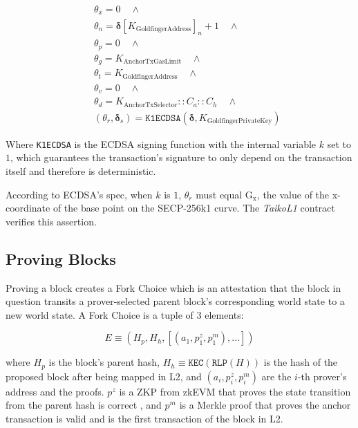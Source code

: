\documentclass[9pt,oneside]{amsart}
\begin{document}
\begin{multicols}{2}
\begin{eqnarray}
& & \theta_x = 0 \quad \wedge \\
\nonumber& & \theta_n = \boldsymbol{\delta}[K_{\mathrm{GoldfingerAddress}}]_n + 1 \quad \wedge \\
\nonumber& & \theta_p = 0 \quad \wedge \\
\nonumber& & \theta_g = K_{\mathrm{AnchorTxGasLimit}} \quad \wedge \\
\nonumber& & \theta_t = K_{\mathrm{GoldfingerAddress}} \quad \wedge  \\
\nonumber& & \theta_v = 0 \quad \wedge  \\
\nonumber& & \theta_d = K_{\mathrm{AnchorTxSelector}}::C_a::C_h \quad \wedge  \\
\nonumber& & (\theta_r,\boldsymbol{\delta}_s) = \texttt{K1ECDSA}(\boldsymbol{\delta}, K_{\mathrm{GoldfingerPrivateKey}})
\end{eqnarray}

Where \texttt{K1ECDSA} is the ECDSA\cite{ecdsa} signing function with the internal variable $k$ set to $1$, which guarantees the transaction's signature to only depend on the transaction itself and therefore is deterministic\cite{ecdsak}.

According to ECDSA's spec, when $k$ is $1$, $\theta_r$ must equal $\mathrm{G_x}$, the value of the x-coordinate of the base point on the SECP-256k1 curve. The \textit{TaikoL1} contract verifies this assertion.


\subsection{Proving Blocks} \label{sec:proving}

Proving a block creates a Fork Choice which is an attestation that the block in question transits a prover-selected parent block's corresponding world state to a new world state. A Fork Choice is a tuple of 3 elements:

\begin{equation}
E \equiv (H_p, H_h, [(a_1, p^{z}_1, p^{m}_1),...])
\end{equation}

where $H_p$ is the block's parent hash, $H_h \equiv \texttt{KEC}(\texttt{RLP}(H))$ is the hash of the proposed block after being mapped in L2, and $(a_i, p^{z}_i, p^{m}_i)$ are the $i$-th prover's address and the proofs. $p^{z}$ is a ZKP from zkEVM that proves the state transition from the parent hash is correct , and $p^{m}$ is a Merkle proof that proves the anchor transaction is valid and is the first transaction of the block in L2.


\end{multicols}
\end{document}
